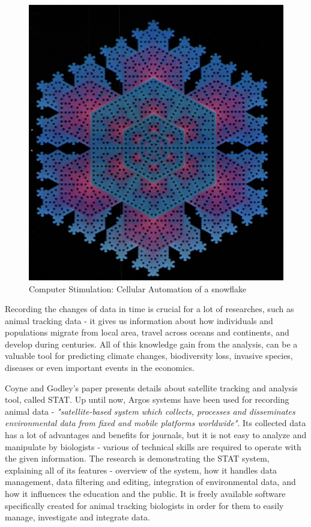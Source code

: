 \begin{figure}[h]
\centering
\includegraphics[scale=0.6]{images/snowflake_algorithm}
\caption{Computer Stimulation: Cellular Automation of a snowflake}
\label{fig:snowflake}
\end{figure}

Recording the changes of data in time is crucial for a lot of researches, such as animal tracking data - it gives us information about how individuals and populations migrate from local area, travel across oceans and continents, and develop during centuries. All of this knowledge gain from the analysis, can be a valuable tool for predicting climate changes, biodiversity loss, invasive species, diseases or even important events in the economics. \cite{coyne2005satellite}

Coyne and Godley's paper \cite{coyne2005satellite} presents details about satellite tracking and analysis tool, called STAT. Up until now, Argos systems have been used for recording animal data - \textit{"satellite-based system which collects, processes and disseminates environmental data from fixed and mobile platforms worldwide"}.\cite{argosWiki} Its collected data has a lot of advantages and benefits for journals, but it is not easy to analyze and manipulate by biologists - various of technical skills are required to operate with the given information. The research is demonstrating the STAT system, explaining all of its features - overview of the system, how it handles data management, data filtering and editing, integration of environmental data, and how it influences the education and the public. It is freely available software specifically created for animal tracking biologists in order for them to easily manage, investigate and integrate data. 


